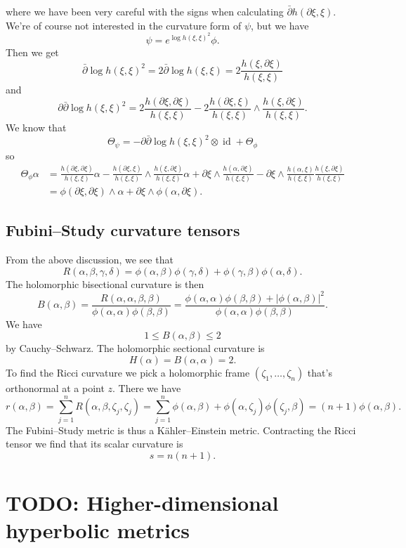 \documentclass[11pt]{article}
\DeclareMathOperator{\id}{id}
\begin{document}
where we have been very careful with the signs when calculating $\bar\partial h(\partial\xi, \xi)$.
We're of course not interested in the curvature form of $\psi$, but we have
$$
\psi = e^{\log h(\xi,\xi)^2} \phi.
$$
Then we get
$$
\bar\partial \log h(\xi,\xi)^2
= 2\bar\partial \log h(\xi,\xi)
= 2 \frac{h(\xi,\partial\xi)}{h(\xi,\xi)}
$$
and
$$
\partial\bar\partial \log h(\xi,\xi)^2
= 2 \frac{h(\partial\xi,\partial\xi)}{h(\xi,\xi)}
- 2 \frac{h(\partial\xi,\xi)}{h(\xi,\xi)} \wedge \frac{h(\xi,\partial\xi)}{h(\xi,\xi)}.
$$
We know that
$$
\Theta_\psi = - \partial\bar\partial \log h(\xi,\xi)^2 \otimes \id + \Theta_\phi
$$
so
\begin{align*}
\Theta_\phi \alpha
&= \frac{h(\partial\xi,\partial\xi)}{h(\xi,\xi)} \alpha
- \frac{h(\partial\xi,\xi)}{h(\xi,\xi)}\wedge \frac{h(\xi,\partial\xi)}{h(\xi,\xi)} \alpha
+ \partial\xi \wedge \frac{h(\alpha,\partial\xi)}{h(\xi,\xi)}
- \partial\xi \wedge \frac{h(\alpha,\xi)}{h(\xi,\xi)}\frac{h(\xi,\partial\xi)}{h(\xi,\xi)}
\\
&= \phi(\partial\xi, \partial\xi) \wedge \alpha
+ \partial\xi \wedge \phi(\alpha, \partial\xi).
\end{align*}


\subsection{Fubini--Study curvature tensors}

From the above discussion, we see that
$$
R(\alpha,\beta,\gamma,\delta)
= \phi(\alpha,\beta)\phi(\gamma,\delta) + \phi(\gamma,\beta)\phi(\alpha,\delta).
$$
The holomorphic bisectional curvature is then
$$
B(\alpha,\beta) = \frac{R(\alpha,\alpha,\beta,\beta)}{\phi(\alpha,\alpha)\phi(\beta,\beta)}
= \frac{\phi(\alpha,\alpha)\phi(\beta,\beta)+|\phi(\alpha,\beta)|^2}{\phi(\alpha,\alpha)\phi(\beta,\beta)}.
$$
We have
$$
1 \leq B(\alpha,\beta) \leq 2
$$
by Cauchy--Schwarz. The holomorphic sectional curvature is
$$
H(\alpha) = B(\alpha,\alpha) = 2.
$$
To find the Ricci curvature we pick a holomorphic frame $(\zeta_1, \ldots, \zeta_n)$ that's orthonormal at a point $z$. There we have
$$
r(\alpha,\beta)
= \sum_{j=1}^n R(\alpha,\beta,\zeta_j,\zeta_j)
= \sum_{j=1}^n \phi(\alpha,\beta) + \phi(\alpha,\zeta_j)\phi(\zeta_j,\beta)
= (n+1) \phi(\alpha,\beta).
$$
The Fubini--Study metric is thus a K\"ahler--Einstein metric. Contracting the Ricci tensor we find that its scalar curvature is
$$
s = n(n+1).
$$


\section{TODO: Higher-dimensional hyperbolic metrics}
\label{sec:org21fa1aa}
\end{document}
